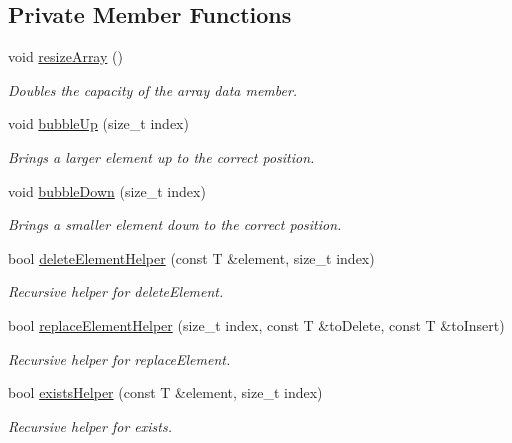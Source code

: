 \subsection*{Private Member Functions}
\begin{DoxyCompactItemize}
\item 
\mbox{\label{class_max_heap_a06b1a2f848736257ad47b48c98cb0aa1}} 
void \hyperlink{class_max_heap_a06b1a2f848736257ad47b48c98cb0aa1}{resize\+Array} ()
\begin{DoxyCompactList}\small\item\em Doubles the capacity of the array data member. \end{DoxyCompactList}\item 
void \hyperlink{class_max_heap_a9799c77a0dccb11d45e22e2756659af1}{bubble\+Up} (size\+\_\+t index)
\begin{DoxyCompactList}\small\item\em Brings a larger element up to the correct position. \end{DoxyCompactList}\item 
void \hyperlink{class_max_heap_a6edb154786d8720f218d539244f9efaa}{bubble\+Down} (size\+\_\+t index)
\begin{DoxyCompactList}\small\item\em Brings a smaller element down to the correct position. \end{DoxyCompactList}\item 
bool \hyperlink{class_max_heap_a26d90c2f692856397fa8e4e222b8c549}{delete\+Element\+Helper} (const T \&element, size\+\_\+t index)
\begin{DoxyCompactList}\small\item\em Recursive helper for delete\+Element. \end{DoxyCompactList}\item 
bool \hyperlink{class_max_heap_a26e23759a8c4a77c01b3b7d4f0eca424}{replace\+Element\+Helper} (size\+\_\+t index, const T \&to\+Delete, const T \&to\+Insert)
\begin{DoxyCompactList}\small\item\em Recursive helper for replace\+Element. \end{DoxyCompactList}\item 
bool \hyperlink{class_max_heap_a47d8b82e83d9877f8251d9b533fecea2}{exists\+Helper} (const T \&element, size\+\_\+t index)
\begin{DoxyCompactList}\small\item\em Recursive helper for exists. \end{DoxyCompactList}\item 

\end{DoxyCompactItemize}
